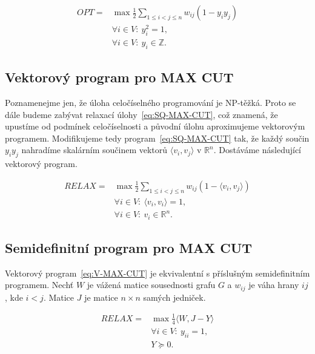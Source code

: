 \begin{equation}\tag{SQ-MAX-CUT}
    \begin{split}
        OPT = &\max \frac{1}{2} \sum_{1 \leq i < j \leq n} w_{ij} (1 - y_i y_j) \\
        &\forall i \in V:\ y_i^2 = 1, \\
        &\forall i \in V:\ y_i \in \mathbb{Z}.
    \end{split}
    \label{eq:SQ-MAX-CUT}
\end{equation}


\subsection{Vektorový program pro MAX CUT}

Poznamenejme jen, že úloha celočíselného programování je NP-těžká. Proto se dále budeme zabývat relaxací úlohy~\ref{eq:SQ-MAX-CUT}, což znamená, že upustíme od podmínek celočíselnosti a původní úlohu aproximujeme vektorovým programem. Modifikujeme tedy program~\ref{eq:SQ-MAX-CUT} tak, že každý součin $y_i y_j$ nahradíme skalárním součinem vektorů $\langle v_i, v_j \rangle$ v $\mathbb{R}^n$. Dostáváme následující vektorový program.

\begin{equation}\tag{V-MAX-CUT}
    \begin{split}
        RELAX = &\max \frac{1}{2} \sum_{1 \leq i < j \leq n} w_{ij} (1 - \langle v_i, v_j \rangle) \\
        &\forall i \in V:\ \langle v_i, v_i \rangle = 1, \\
        &\forall i \in V:\ v_i \in \mathbb{R}^n.
    \end{split}
    \label{eq:V-MAX-CUT}
\end{equation}


\subsection{Semidefinitní program pro MAX CUT}

Vektorový program~\ref{eq:V-MAX-CUT} je ekvivalentní s příslušným semidefinitním programem. Nechť $W$ je vážená matice sousednosti grafu $G$ a $w_{ij}$ je váha hrany $ij$, kde $i < j$. Matice $J$ je matice $n \times n$ samých jedniček.

\begin{equation}\tag{SDP-MAX-CUT}
    \begin{split}
        RELAX = &\max \frac{1}{4} \langle W, J - Y \rangle \\
        &\forall i \in V:\ y_{ii} = 1, \\
        &Y \succeq 0.
    \end{split}
    \label{eq:SDP-MAX-CUT}
\end{equation}

